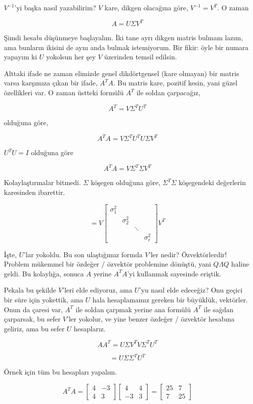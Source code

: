 \documentclass[12pt,fleqn]{article}\usepackage{../../common}
\begin{document}
$V^{-1}$'yi başka nasıl yazabilirim? $V$ kare, dikgen olacağına göre,
$V^{-1} = V^{T}$. O zaman 

$$ A = U \Sigma V^{T} $$

Şimdi hesabı düşünmeye başlayalım. İki tane ayrı dikgen matris bulmam
lazım, ama bunların ikisini de aynı anda bulmak istemiyorum. Bir fikir:
öyle bir numara yapayım ki $U$ yokolsun her şey $V$ üzerinden temsil
edilsin. 

Alttaki ifade ne zaman elimizde genel dikdörtgensel (kare olmayan) bir
matris varsa karşımıza çıkan bir ifade, $A^TA$. Bu matris kare, pozitif
kesin, yani güzel özellikleri var. O zaman üstteki formülü $A^T$ ile soldan
çarpacağız,

$$ A^T = V \Sigma^T U^{T}  $$

olduğuna göre,

$$ A^TA = V \Sigma^T U^{T}  U \Sigma V^{T}  $$

$U^TU = I$ olduğuna göre

$$ A^TA = V \Sigma^T \Sigma V^{T}  $$

Kolaylaştırmalar bitmedi. $\Sigma$ köşegen olduğuna göre, $\Sigma^T\Sigma$
köşegendeki değerlerin karesinden ibarettir. 

$$ = V 
\left[\begin{array}{rrrr}
\sigma_1^2 &&& \\
 & \sigma_2^2 &  & \\
&& \ddots & \\
&&& \sigma_r^2 
\end{array}\right] 
V^T
  $$

İşte, $U$'lar yokoldu. Bu son ulaştığımız formda $V$'ler nedir?
Özvektörlerdir! Problem mükemmel bir özdeğer / özvektör problemine
dönüştü, yani $Q\Lambda Q$ haline geldi. Bu kolaylığa, sonuca $A$ yerine $A^TA$'yi
kullanmak sayesinde eriştik.

Pekala bu şekilde $V$'leri elde ediyoruz, ama $U$'yu nasıl elde edeceğiz?
Onu geçici bir süre için yokettik, ama $U$ hala hesaplamamız gereken bir
büyüklük, vektörler. Onun da çaresi var, $A^T$ ile soldan çarpmak yerine ana
formülü $A^T$ ile sağdan çarparsak, bu sefer $V$'ler yokolur, ve yine
benzer özdeğer / özvektör hesabına geliriz, ama bu sefer $U$ hesaplarız.

$$ AA^T = U\Sigma V^TV\Sigma^TU^T $$

$$  = U\Sigma \Sigma^TU^T $$

Örnek için tüm bu hesapları yapalım. 

$$ 
A^TA = 
\left[\begin{array}{rr}
4 & -3 \\ 4 & 3
\end{array}\right]
\left[\begin{array}{rr}
4 & 4 \\ -3 & 3
\end{array}\right] = 
\left[\begin{array}{cc}
25 & 7 \\ 7 & 25
\end{array}\right]
$$
\end{document}
